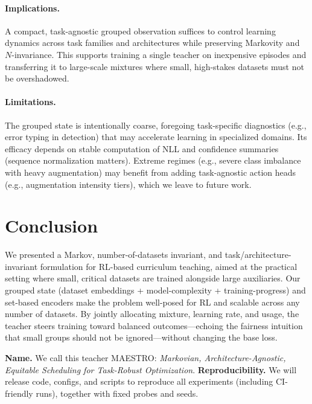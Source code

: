 \documentclass[11pt]{article}
\newcommand{\1}{\mathbf{1}}
\newcommand{\MAESTRO}{\textsc{MAESTRO}\xspace}
\begin{document}
\paragraph{Implications.}
A compact, task-agnostic grouped observation suffices to control learning dynamics across task families and architectures while preserving Markovity and $N$-invariance. This supports training a single teacher on inexpensive episodes and transferring it to large-scale mixtures where small, high-stakes datasets must not be overshadowed.

\paragraph{Limitations.}
The grouped state is intentionally coarse, foregoing task-specific diagnostics (e.g., error typing in detection) that may accelerate learning in specialized domains. Its efficacy depends on stable computation of NLL and confidence summaries (sequence normalization matters). Extreme regimes (e.g., severe class imbalance with heavy augmentation) may benefit from adding task-agnostic action heads (e.g., augmentation intensity tiers), which we leave to future work.

\section{Conclusion}
We presented a Markov, number-of-datasets invariant, and task/architecture-invariant formulation for RL-based curriculum teaching, aimed at the practical setting where small, critical datasets are trained alongside large auxiliaries. Our grouped state (dataset embeddings + model-complexity + training-progress) and set-based encoders make the problem well-posed for RL and scalable across any number of datasets. By jointly allocating mixture, learning rate, and usage, the teacher steers training toward balanced outcomes—echoing the fairness intuition that small groups should not be ignored—without changing the base loss. 

\medskip\noindent\textbf{Name.} We call this teacher \MAESTRO{}: \emph{Markovian, Architecture-Agnostic, Equitable Scheduling for Task-Robust Optimization}.
\noindent\textbf{Reproducibility.}
We will release code, configs, and scripts to reproduce all experiments (including CI-friendly runs), together with fixed probes and seeds.
\end{document}

